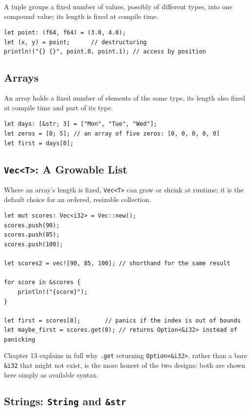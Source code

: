 \documentclass[11pt]{book}
\begin{document}
A tuple groups a fixed number of values, possibly of different types, into one compound value; its length is fixed at compile time.

\begin{lstlisting}
let point: (f64, f64) = (3.0, 4.0);
let (x, y) = point;      // destructuring
println!("{} {}", point.0, point.1); // access by position
\end{lstlisting}

\subsection*{Arrays}

An array holds a fixed number of elements of the same type, its length also fixed at compile time and part of its type.

\begin{lstlisting}
let days: [&str; 3] = ["Mon", "Tue", "Wed"];
let zeros = [0; 5]; // an array of five zeros: [0, 0, 0, 0, 0]
let first = days[0];
\end{lstlisting}

\subsection*{\texttt{Vec<T>}: A Growable List}

Where an array's length is fixed, \texttt{Vec<T>} can grow or shrink at runtime; it is the default choice for an ordered, resizable collection.

\begin{lstlisting}
let mut scores: Vec<i32> = Vec::new();
scores.push(90);
scores.push(85);
scores.push(100);

let scores2 = vec![90, 85, 100]; // shorthand for the same result

for score in &scores {
    println!("{score}");
}

let first = scores[0];       // panics if the index is out of bounds
let maybe_first = scores.get(0); // returns Option<&i32> instead of panicking
\end{lstlisting}

Chapter 13 explains in full why \texttt{.get} returning \texttt{Option<\&i32>}, rather than a bare \texttt{\&i32} that might not exist, is the more honest of the two designs; both are shown here simply as available syntax.

\subsection*{Strings: \texttt{String} and \texttt{\&str}}
\end{document}
